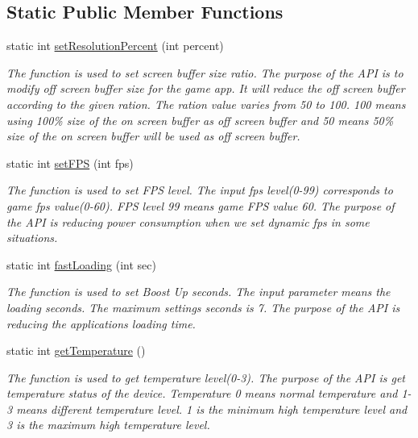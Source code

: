 \subsection*{Static Public Member Functions}
\begin{DoxyCompactItemize}
\item 
static int \hyperlink{classEnhanceAPI_a761e06b7b1a111b7db223cc43f7a27a7}{set\+Resolution\+Percent} (int percent)
\begin{DoxyCompactList}\small\item\em The function is used to set screen buffer size ratio. The purpose of the A\+PI is to modify off screen buffer size for the game app. It will reduce the off screen buffer according to the given ration. The ration value varies from 50 to 100. 100 means using 100\% size of the on screen buffer as off screen buffer and 50 means 50\% size of the on screen buffer will be used as off screen buffer. \end{DoxyCompactList}\item 
static int \hyperlink{classEnhanceAPI_a07e1cdf5ec67fd23763eb40ec4153383}{set\+F\+PS} (int fps)
\begin{DoxyCompactList}\small\item\em The function is used to set F\+PS level.  The input fps level(0-\/99) corresponds to game fps value(0-\/60). F\+PS level 99 means game F\+PS value 60. The purpose of the A\+PI is reducing power consumption when we set dynamic fps in some situations. \end{DoxyCompactList}\item 
static int \hyperlink{classEnhanceAPI_a5dc471f12c3c08f0e9f13753a6754999}{fast\+Loading} (int sec)
\begin{DoxyCompactList}\small\item\em The function is used to set Boost Up seconds. The input parameter means the loading seconds. The maximum settings seconds is 7. The purpose of the A\+PI is reducing the application\textquotesingle{}s loading time. \end{DoxyCompactList}\item 
static int \hyperlink{classEnhanceAPI_abf1d3068cc786539099418d67aa9ea4e}{get\+Temperature} ()
\begin{DoxyCompactList}\small\item\em The function is used to get temperature level(0-\/3). The purpose of the A\+PI is get temperature status of the device. Temperature 0 means normal temperature and 1-\/3 means different temperature level. 1 is the minimum high temperature level and 3 is the maximum high temperature level. \end{DoxyCompactList}\item 

\end{DoxyCompactItemize}
